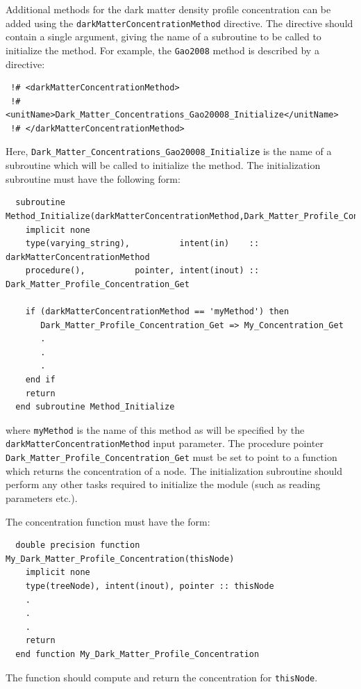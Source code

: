 Additional methods for the dark matter density profile concentration can be added using the {\tt darkMatterConcentrationMethod} directive. The directive should contain a single argument, giving the name of a subroutine to be called to initialize the method. For example, the {\tt Gao2008} method is described by a directive:
\begin{verbatim}
 !# <darkMatterConcentrationMethod>
 !#  <unitName>Dark_Matter_Concentrations_Gao20008_Initialize</unitName>
 !# </darkMatterConcentrationMethod>
\end{verbatim}
Here, {\tt Dark\_Matter\_Concentrations\_Gao20008\_Initialize} is the name of a subroutine which will be called to initialize the method. The initialization subroutine must have the following form:
\begin{verbatim}
  subroutine Method_Initialize(darkMatterConcentrationMethod,Dark_Matter_Profile_Concentration_Get)
    implicit none
    type(varying_string),          intent(in)    :: darkMatterConcentrationMethod
    procedure(),          pointer, intent(inout) :: Dark_Matter_Profile_Concentration_Get
    
    if (darkMatterConcentrationMethod == 'myMethod') then
       Dark_Matter_Profile_Concentration_Get => My_Concentration_Get
       .
       .
       .
    end if
    return
  end subroutine Method_Initialize
\end{verbatim}
where {\tt myMethod} is the name of this method as will be specified by the {\tt darkMatterConcentrationMethod} input parameter. The procedure pointer {\tt Dark\_Matter\_Profile\_Concentration\_Get} must be set to point to a function which returns the concentration of a node. The initialization subroutine should perform any other tasks required to initialize the module (such as reading parameters etc.).

The concentration function must have the form:
\begin{verbatim}
  double precision function My_Dark_Matter_Profile_Concentration(thisNode)
    implicit none
    type(treeNode), intent(inout), pointer :: thisNode
    .
    .
    .
    return
  end function My_Dark_Matter_Profile_Concentration
\end{verbatim}
The function should compute and return the concentration for {\tt thisNode}.

